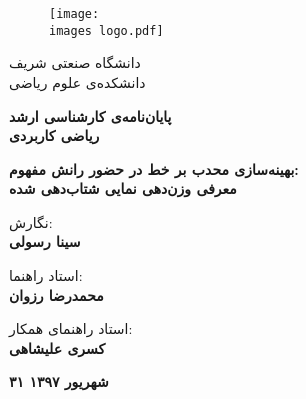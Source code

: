 \documentclass[a4paper,11px]{article}
\begin{document}
\thispagestyle{empty}
\begin{figure}[!hbt]
\centering
\texttt{[image: \\images logo.pdf]}
\centering
\end{figure}

\vspace{-5mm}
\begin{center}
\large
دانشگاه صنعتی شریف\\
دانشکده‌ی علوم ریاضی
\end{center}

\vspace{5mm}
\begin{center}
\large
\textbf{
پایان‌نامه‌ی کارشناسی ارشد\\
ریاضی کاربردی
}
\end{center}


\vspace{5mm}
\begin{center}
\Large
\textbf{
بهینه‌سازی محدب بر خط در حضور رانش مفهوم:\\
معرفی وزن‌دهی نمایی شتاب‌دهی شده
}
\end{center}


\vspace{10mm}
\begin{center}
\large
نگارش:
\\
\textbf{
سینا رسولی
}
\end{center}



\vspace{10mm}
\begin{center}
\large
استاد راهنما:
\\
\textbf{
محمدرضا رزوان
}
\end{center}

\vspace{2mm}

\begin{center}
\large
استاد راهنمای همکار:
\\
\textbf{
کسری علیشاهی
}
\end{center}



\vfill
\begin{center}
\Large \textbf{
۳۱ شهریور ۱۳۹۷
}
\end{center}


\newpage


\vfill
\end{document}
